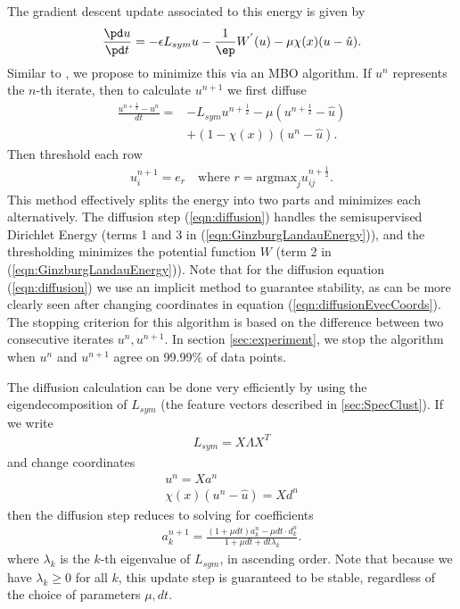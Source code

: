\documentclass[journal]{IEEEtran}
\begin{document}
The gradient descent update associated to this energy is given by
\begin{align}
  \frac{\pd u}{\pd t} = -\epsilon L_{sym} u - \frac{1}{\ep}W^{'}(u) - \mu\chi(x)(u-\hat{u}).
\end{align}
Similar to \cite{Merkurjev13,Garcia2014,Meng17}, we propose to minimize this via
an MBO algorithm. If $u^{n}$ represents the $n$-th iterate, then to calculate
$u^{n+1}$ we first diffuse
\begin{align}\label{eqn:diffusion}
  \frac{u^{n+\frac{1}{2}}-u^n}{dt} = &-L_{sym} u^{n+\frac{1}{2}} - \mu (u^{n+\frac{1}{2}}-\hat{u}) \nonumber \\
  & + (1 - \chi(x))(u^n - \hat{u}).
\end{align}
Then threshold each row
\begin{align}\label{eqn:threshold}
  u_i^{n+1} = e_r \quad \text{where }r = \text{argmax}_ju_{ij}^{n+\frac{1}{2}}.
\end{align}
This method effectively splits the energy into two parts and minimizes each
alternatively. The diffusion step (\ref{eqn:diffusion}) handles the
semisupervised Dirichlet Energy (terms 1 and 3 in
(\ref{eqn:GinzburgLandauEnergy})), and the thresholding minimizes the potential
function $W$ (term 2 in (\ref{eqn:GinzburgLandauEnergy})). Note that for the diffusion equation (\ref{eqn:diffusion}) we use an implicit method to guarantee stability, as can be more clearly seen after changing coordinates in equation (\ref{eqn:diffusionEvecCoords}). The stopping
criterion for this algorithm is based on the difference between two consecutive
iterates $u^n,u^{n+1}$. In section \ref{sec:experiment}, we stop the algorithm
when $u^n$ and $u^{n+1}$ agree on 99.99\% of data points.

The diffusion calculation can be done very efficiently by using the
eigendecomposition of $L_{sym}$ (the feature vectors described in
\ref{sec:SpecClust}). If we write
\begin{align}\label{eqn:GLeigendecomposition}
  L_{sym} = X\Lambda X^T
\end{align}
and change coordinates
\begin{align}
  u^n = Xa^n \\
  \chi(x)(u^n - \hat{u}) = Xd^n
\end{align}
then the diffusion step reduces to solving for coefficients
\begin{align}\label{eqn:diffusionEvecCoords}
  a_k^{n+1} = \frac{(1+\mu dt)a_k^n - \mu dt\cdot d_k^n}{1+\mu dt + dt \lambda_k}.
\end{align}
where $\lambda_k$ is the $k$-th eigenvalue of $L_{sym}$, in ascending order. Note that because we have $\lambda_k \geq 0$ for all $k$, this update step is guaranteed to be stable, regardless of the choice of parameters $\mu, dt$.
\end{document}
